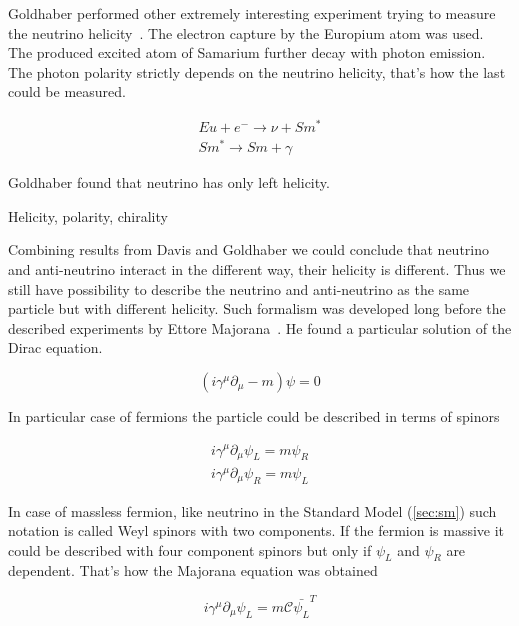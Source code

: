 \documentclass[../main.tex]{subfiles}
\begin{document}
Goldhaber performed other extremely interesting experiment trying to measure the neutrino helicity~\cite{Goldhaber1958}. The electron capture by the Europium atom was used. The produced excited atom of Samarium further decay with photon emission. The photon polarity strictly depends on the neutrino helicity, that's how the last could be measured.

\begin{eqnarray}
Eu+e^-\to\nu+Sm^* \\ \nonumber
Sm^*\to Sm+\gamma
\end{eqnarray}

Goldhaber found that neutrino has only left helicity.

\begin{bclogo}[couleur=blue!2, arrondi=0.1, logo=\bcinfo, nobreak=true]{Helicity, polarity, chirality}

\end{bclogo}

Combining results from Davis and Goldhaber we could conclude that neutrino and anti-neutrino interact in the different way, their helicity is different. Thus we still have possibility to describe the neutrino and anti-neutrino as the same particle but with different helicity. Such formalism was developed long before the described experiments by Ettore Majorana~\cite{Majorana1937}. He found a particular solution of the Dirac equation.

\begin{equation}
\left(i\gamma^\mu\partial_\mu-m\right)\psi=0
\end{equation}

In particular case of fermions the particle could be described in terms of spinors

\begin{eqnarray}
i\gamma^\mu\partial_\mu\psi_L=m\psi_R\\ \nonumber
i\gamma^\mu\partial_\mu\psi_R=m\psi_L
\end{eqnarray}

In case of massless fermion, like neutrino in the Standard Model (\autoref{sec:sm}) such notation is called Weyl spinors with two components. If the fermion is massive it could be described with four component spinors but only if $\psi_L$ and $\psi_R$ are dependent. That's how the Majorana equation was obtained

\begin{equation}
i\gamma^\mu\partial_\mu\psi_L=m\mathcal{C}\bar{\psi_L}^{T}
\end{equation}
\end{document}
